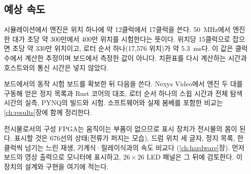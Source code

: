 \subsection{예상 속도}

시뮬레이션에서 엔진은 위치 하나에 약 12클럭에서 17클럭을 쓴다. 50~MHz에서 엔진 한 대가 초당 약 300만에서
400만 위치를 시험한다는 뜻이다. 위치당 15클럭으로 잡으면 초당 약 330만 위치이고, 로터 순서 하나(17,576 위치)가
약 5.3~ms다. 이 값은 클럭 수에서 계산한 추정이며 보드에서 측정한 값이 아니다. 치환표를 다시 계산하는 시간과
호스트와의 통신 시간은 넣지 않았다.

\begin{todobox}{보드에서의 동작 시험}
보드를 확보한 뒤 다음을 쓴다. Nexys Video에서 엔진 두 대를 구동해 얻은 정지 목록과 Rust 코어의 대조,
로터 순서 하나의 스윕 시간과 전체 탐색 시간의 실측, PYNQ의 빌드와 시험. 소프트웨어와 실제 봄베를 포함한
비교는 \ref{ch:results}장에 함께 정리한다.
\end{todobox}

\begin{todobox}{전시물로서의 구성}
FPGA는 움직이는 부품이 없으므로 표시 장치가 전시물의 몸이 된다. 표시할 것은 676선의 상태(전류가 퍼지는
모습), 드럼 위치 세 글자, 정지 목록, 한 클럭씩 넘기는 느린 재생, 기계식·릴레이식과의 속도 비교다
(\ref{ch:hardware}장). 먼저 보드의 영상 출력으로 모니터에 표시하고, $26\times26$ LED 패널은 그 뒤에
검토한다. 이 장치의 설계와 구현을 여기에 적는다.
\end{todobox}
